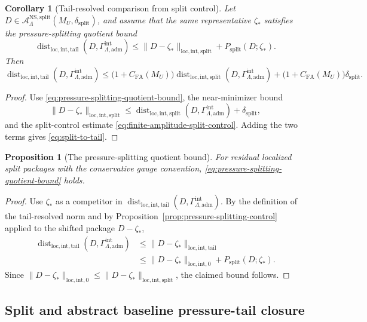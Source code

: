 \documentclass[11pt]{article}
\numberwithin{equation}{section}
\newtheorem{proposition}[proposition]{Proposition}
\newtheorem{corollary}[corollary]{Corollary}
\theoremstyle{definition}
\theoremstyle{remark}
\DeclareMathOperator{\dist}{dist}
\newcommand{\NS}{\mathrm{NS}}
\newcommand{\loc}{\mathrm{loc}}
\newcommand{\intg}{\mathrm{int}}
\newcommand{\tail}{\mathrm{tail}}
\newcommand{\spl}{\mathrm{split}}
\newcommand{\adm}{\mathrm{adm}}
\newcommand{\calA}{\mathcal A}
\newcommand{\Gammaadm}{\Gamma^{\intg}_{\Lambda,\adm}}
\begin{document}
\begin{corollary}[Tail-resolved comparison from split control]\label{cor:split-to-tail}
Let $D\in\calA^{\NS,\spl}_{\Lambda}(M_U,\delta_{\spl})$, and assume that the same
representative $\zeta_*$ satisfies the pressure-splitting quotient bound
\begin{equation}\label{eq:pressure-splitting-quotient-bound}
\dist_{\loc,\intg,\tail}(D,\Gammaadm)
\le
\|D-\zeta_*\|_{\loc,\intg,\spl}+P_{\spl}(D;\zeta_*).
\end{equation}
Then
\begin{equation}\label{eq:split-to-tail}
\dist_{\loc,\intg,\tail}(D,\Gammaadm)
\le
\bigl(1+C_{\mathrm{FA}}(M_U)\bigr)
\dist_{\loc,\intg,\spl}(D,\Gammaadm)
+
\bigl(1+C_{\mathrm{FA}}(M_U)\bigr)\delta_{\spl}.
\end{equation}
\end{corollary}

\begin{proof}
Use \eqref{eq:pressure-splitting-quotient-bound}, the near-minimizer bound
\[
        \|D-\zeta_*\|_{\loc,\intg,\spl}
        \le
        \dist_{\loc,\intg,\spl}(D,\Gammaadm)+\delta_{\spl},
\]
and the split-control estimate \eqref{eq:finite-amplitude-split-control}.  Adding the two
terms gives \eqref{eq:split-to-tail}.
\end{proof}

\begin{proposition}[The pressure-splitting quotient bound]\label{prop:pressure-splitting-quotient-bound}
For residual localized split packages with the conservative gauge convention,
\eqref{eq:pressure-splitting-quotient-bound} holds.
\end{proposition}

\begin{proof}
Use $\zeta_*$ as a competitor in $\dist_{\loc,\intg,\tail}(D,\Gammaadm)$.  By the definition
of the tail-resolved norm and by Proposition~\ref{prop:pressure-splitting-control} applied to the
shifted package $D-\zeta_*$,
\begin{align*}
\dist_{\loc,\intg,\tail}(D,\Gammaadm)
&\le
\|D-\zeta_*\|_{\loc,\intg,\tail} \\
&\le
\|D-\zeta_*\|_{\loc,\intg,0}
+P_{\spl}(D;\zeta_*).
\end{align*}
Since $\|D-\zeta_*\|_{\loc,\intg,0}\le\|D-\zeta_*\|_{\loc,\intg,\spl}$, the claimed bound
follows.
\end{proof}

\subsection{Split and abstract baseline pressure-tail closure}
\label{sec:main-theorems}
\end{document}
